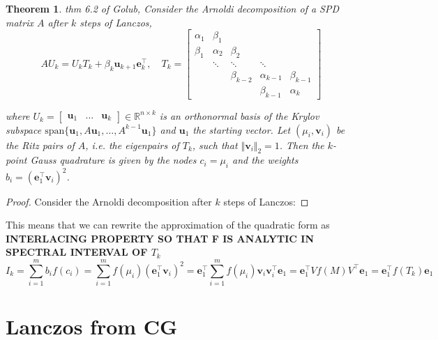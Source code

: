 \documentclass{article}
\newtheorem{theorem}{Theorem}[section]
\newcommand{\vect}[1]{\boldsymbol{\mathbf{#1}}}
\newcommand{\R}{\mathbb R}
\begin{document}
\begin{theorem}
thm 6.2 of Golub, Consider the Arnoldi decomposition of a SPD matrix $A$ after $k$ steps of Lanczos,
\begin{equation*}
    A U_k = U_k T_k + \beta_k \vect u_{k+1} \vect e_k^\top, \quad T_k = \begin{bmatrix}
        \alpha_1 & \beta_1  &               &               & \\
        \beta_1  & \alpha_2 & \beta_2       &               & \\
                 & \ddots   & \ddots        & \ddots        & \\
                 &          & \beta_{k-2}   & \alpha_{k-1}  & \beta_{k-1} \\
                 &          &               & \beta_{k-1}   & \alpha_k
    \end{bmatrix}
\end{equation*}

where $U_k = \begin{bmatrix} \vect u_1 & \dots & \vect u_k \end{bmatrix} \in\R^{n\times k}$ is an orthonormal basis of the Krylov subspace $\text{span}\{\vect u_1, A \vect u_1, \ldots, A^{k-1} \vect u_1\}$ and $\vect u_1$ the starting vector. Let $(\mu_i, \vect v_i)$ be the Ritz pairs of $A$, i.e. the eigenpairs of $T_k$, such that $\Vert \vect v_i \Vert_2 = 1$. Then the $k$-point Gauss quadrature is given by the nodes $c_i = \mu_i$ and the weights $b_i = (\vect e_1^\top \vect v_i)^2$.
\end{theorem}
\begin{proof}
Consider the Arnoldi decomposition after $k$ steps of Lanczos:

\end{proof}

This means that we can rewrite the approximation of the quadratic form as \textbf{INTERLACING PROPERTY SO THAT F IS ANALYTIC IN SPECTRAL INTERVAL OF $T_k$}
\begin{equation*}
    I_k = \sum_{i=1}^m b_i f(c_i) = \sum_{i=1}^m f(\mu_i) (\vect e_1^\top \vect v_i)^2 = \vect e_1^\top \sum_{i=1}^m f(\mu_i) \vect v_i \vect v_i^\top \vect e_1 = \vect e_1^\top V f(M) V^\top \vect e_1 = \vect e_1^\top f(T_k) \vect e_1
\end{equation*}


\section{Lanczos from CG}
\end{document}
